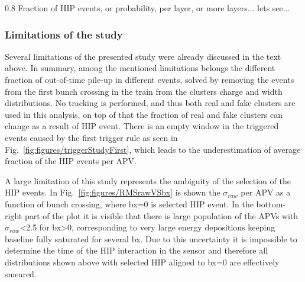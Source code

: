                  {0.8}       %
                 {Fraction of HIP events, or probability, per layer, or more layers... lets see... } %

\subsubsection{Limitations of the study~\label{sec:limitationsSelection}}

Several limitations of the presented study were already discussed in the text above. In summary, among the mentioned limitations belongs the different fraction of out-of-time pile-up in different events, solved by removing the events from the first bunch crossing in the train from the clusters charge and width distributions. No tracking is performed, and thus both real and fake clusters are used in this analysis, on top of that the fraction of real and fake clusters can change as a result of HIP event. There is an empty window in the triggered events caused by the first trigger rule as seen in Fig.~\ref{fig:figures/triggerStudyFirst}, which leads to the underestimation of average fraction of the HIP events per APV.


A large limitation of this study represents the ambiguity of the selection of the HIP events. In Fig.~\ref{fig:figures/RMSrawVSbx} is shown the $\sigma_{raw}$ per APV as a function of bunch crossing, where bx=0 is selected HIP event. In the bottom-right part of the plot it is visible that there is large population of the APVs with $\sigma_{raw}$<2.5 for bx>0, corresponding to very large energy depositions keeping baseline fully saturated for several bx. Due to this uncertainty it is impossible to determine the time of the HIP interaction in the sensor and therefore all distributions shown above with selected HIP aligned to bx=0 are effectively smeared. 


